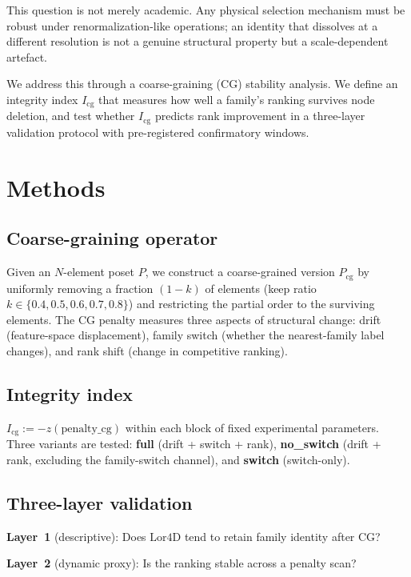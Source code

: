 \documentclass[12pt,a4paper]{article}
\newcommand{\Lor}{\mathrm{Lor4D}}
\newcommand{\Icg}{I_{\mathrm{cg}}}
\begin{document}
This question is not merely academic.
Any physical selection mechanism must be robust under renormalization-like
operations; an identity that dissolves at a different resolution is not a
genuine structural property but a scale-dependent artefact.

We address this through a coarse-graining (CG) stability analysis.
We define an integrity index $\Icg$ that measures how well a family's ranking
survives node deletion, and test whether $\Icg$ predicts rank improvement in a
three-layer validation protocol with pre-registered confirmatory windows.

\section{Methods}

\subsection{Coarse-graining operator}

Given an $N$-element poset $P$, we construct a coarse-grained version
$P_{\mathrm{cg}}$ by uniformly removing a fraction $(1-k)$ of elements
(keep ratio $k\in\{0.4,0.5,0.6,0.7,0.8\}$) and restricting the partial order
to the surviving elements.
The CG penalty measures three aspects of structural change:
drift (feature-space displacement), family switch (whether the nearest-family
label changes), and rank shift (change in competitive ranking).

\subsection{Integrity index}

$\Icg := -z(\text{penalty\_cg})$ within each block of fixed experimental
parameters.
Three variants are tested:
\textbf{full} (drift + switch + rank),
\textbf{no\_switch} (drift + rank, excluding the family-switch channel), and
\textbf{switch} (switch-only).

\subsection{Three-layer validation}

\textbf{Layer~1} (descriptive): Does $\Lor$ tend to retain family identity
after CG?

\textbf{Layer~2} (dynamic proxy): Is the ranking stable across a penalty scan?
\end{document}
